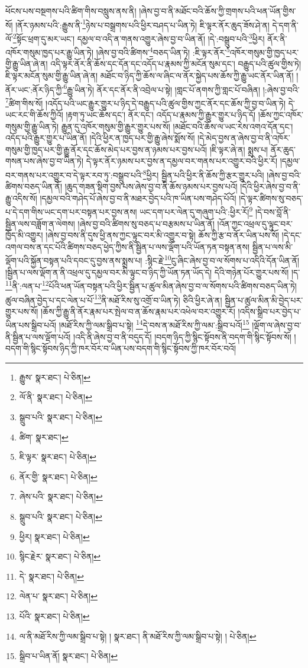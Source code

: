 ཕོངས་པས་བསྔགས་པའི་ཚིག་གིས་བསླུས་ནས་ནི། །ཞེས་བྱ་བ་ནི་མཐོང་བའི་ཆོས་ཀྱི་གྲགས་པའི་ཕན་ཡོན་གྱིས་སོ། །ནོར་ཉམས་པའི་:རྒྱུས་ནི་\footnote{རྒྱུས་  སྣར་ཐང་།  པེ་ཅིན། }ཉེས་པ་བསྒྲགས་པའི་ཕྱིར་བཤད་པ་ཡིན་ཏེ། ཇི་ལྟར་ནོར་ཆུད་ཟོས་ཤེ་ན། དེ་དག་ནི་ལོ་\footnote{ལོ་ནི་  སྣར་ཐང་།  པེ་ཅིན། }སྟོང་ཕྲག་དུ་མར་ཡང་། དམྱལ་བ་འདི་ན་གནས་འགྱུར་ཞེས་བྱ་བ་ཡིན་ནོ། །དེ་:བསྒྲུབ་པའི་\footnote{སྒྲུབ་པའི་  སྣར་ཐང་།  པེ་ཅིན། }ཕྱིར། ནོར་ནི་འཁོར་གསུམ་ཁྱད་པར་རྒྱུ་ཡིན་ཏེ། །ཞེས་བྱ་བའི་ཚིགས་\footnote{ཚིག་  སྣར་ཐང་། }བཅད་ཡིན་ཏེ། :ཇི་ལྟར་ནོར་\footnote{ཇི་ལྟར་  སྣར་ཐང་།  པེ་ཅིན། }འཁོར་གསུམ་གྱི་ཁྱད་པར་གྱི་རྒྱུ་ཡིན་ཞེ་ན། འདི་ལྟར་ནོར་ནི་ཆོས་དང་དོན་དང་འདོད་པ་རྣམས་ཀྱི་མངོན་སུམ་དང་། བརྒྱུད་པའི་ཚུལ་གྱིས་ཏེ། ཇི་ལྟར་མངོན་སུམ་གྱི་རྒྱུ་ཡིན་ཞེ་ན། མཐོང་བ་ཉིད་ཀྱི་ཆོས་ལ་ཞིང་ལ་ནོར་སྐྱེད་པས་ཆོས་ཀྱི་རྒྱུ་ཡང་ནོར་ཡིན་ནོ། །ནོར་ཡང་:ནོར་ཉིད་ཀྱི་\footnote{ནོར་གྱི་  སྣར་ཐང་།  པེ་ཅིན། }རྒྱུ་ཡིན་ཏེ། ནོར་དང་ནོར་ནི་འབྲེལ་པ་སྟེ། །གླང་པོ་ནགས་ཀྱི་གླང་པོ་བཞིན། །:ཞེས་བྱ་བའི་\footnote{ཞེས་པའི་  སྣར་ཐང་།  པེ་ཅིན། }ཚིག་གིས་སོ། །འདོད་པའི་ཡང་རྒྱུར་གྱུར་པ་ཉིད་དེ་བརྒྱུད་པའི་ཚུལ་གྱིས་ཀྱང་ནོར་དང་ཆོས་ཀྱི་བྱ་བ་ཡིན་ཏེ། དེ་ཡང་རང་གི་ཆོས་ཀྱིའོ། །རྟག་ཏུ་ཡང་ཆོས་དང་། ནོར་དང་། འདོད་པ་རྣམས་ཀྱི་རྒྱུར་གྱུར་པ་ཉིད་དོ། །ཆོས་ཀྱང་འཁོར་གསུམ་གྱི་རྒྱུ་ཡིན་ཏེ། རྒྱུན་དུ་འཁོར་གསུམ་གྱི་རྒྱུར་གྱུར་པས་སོ། །མཐོང་བའི་ཆོས་ལ་ཡང་རེས་འགའ་དོན་དང་། འདོད་པའི་རྒྱུར་གྱུར་པ་ཡིན་ནོ། །དེའི་ཕྱིར་ན་ཁྱད་པར་གྱི་རྒྱུ་ཞེས་སྨོས་སོ། །དེ་མེད་བྱས་ན་ཞེས་བྱ་བ་ནི་འཁོར་གསུམ་གྱི་ཁྱད་པར་གྱི་རྒྱུ་ནོར་དང་ཆོས་མེད་པར་བྱས་ན་ཉམས་པར་བྱས་པའོ། །ཇི་ལྟར་ཞེ་ན། སྨྲས་པ། ནོར་ཆུད་གསན་པས་ཞེས་བྱ་བ་ཡིན་ཏེ། དེ་ལྟར་ནོར་ཉམས་པར་བྱས་ན་དམྱལ་བར་གནས་པར་འགྱུར་བའི་ཕྱིར་རོ། །དམྱལ་བར་གནས་པར་འགྱུར་བ་དེ་ལྟར་རབ་ཏུ་:བསྒྲུབ་པའི་\footnote{སྒྲུབ་པའི་  སྣར་ཐང་།  པེ་ཅིན། }ཕྱིར། སྦྱིན་པའི་ཕྱིར་ནི་ཆོས་ཀྱི་རྩར་གྱུར་པའི། །ཞེས་བྱ་བའི་ཚིགས་བཅད་ཡིན་ནོ། །ཆུད་གཟན་སྡིག་བྱས་པས་ཞེས་བྱ་བ་ནི་ཆོས་ཉམས་པར་བྱས་པའོ། །དེའི་ཕྱིར་ཞེས་བྱ་བ་ནི་རྒྱུ་འདིས་སོ། །དམྱལ་བའི་གཤེད་པོ་ཞེས་བྱ་བ་ནི་མཐར་བྱེད་པའི་ཁ་ཡིན་པས་གཤེད་པོའོ། །དེ་ལྟར་ཚིགས་སུ་བཅད་པ་དེ་དག་གིས་ཡང་དག་པར་བསྟན་པར་བྱས་ནས། ཡང་དག་པར་ལེན་དུ་གཞུག་པའི་:ཕྱིར་རོ།\footnote{ཕྱིར།  སྣར་ཐང་།  པེ་ཅིན། } །དེ་བས་བློ་ནི་སྦྱིན་ལས་བཟློག་ན་ལེགས། །ཞེས་བྱ་བའི་ཚིགས་སུ་བཅད་པ་བརྩམས་པ་ཡིན་ནོ། །འོན་ཀྱང་འཕྲལ་དུ་ལྟུང་བར་ཁྱོད་མི་འགྱུར། །ཞེས་བྱ་བས་ནི་དུས་ཕྱི་ནས་ཀྱང་ལྟུང་བར་མི་འགྱུར་བ་སྟེ། ཆོས་ཀྱི་རྩ་བ་ནོར་ཡིན་པས་སོ། །དེ་དང་འགལ་བས་ན་དང་པོའི་ཚིགས་བཅད་ཕྱེད་ཀྱིས་ནི་སྦྱིན་པ་ལས་ལྡོག་པའི་ཡོན་ཏན་བསྟན་ནས། སྦྱིན་པ་ལས་མི་ལྡོག་པའི་སྐྱོན་བསྟན་པའི་དབང་དུ་བྱས་ནས་སྨྲས་པ། :སྙིང་རྗེ་\footnote{སྙིང་རྗེར་  སྣར་ཐང་།  པེ་ཅིན། }ངུ་ཞིང་ཞེས་བྱ་བ་ལ་སོགས་པ་འདིའི་དོན་ཡིན་ནོ། །སྦྱིན་པ་ལས་ལྡོག་ན་ནི་འཕྲལ་དུ་དམྱལ་བར་མི་ལྟུང་བ་ཉིད་ཀྱི་ཡོན་ཏན་ཡོད་དེ། དེའི་གཉེན་པོར་གྱུར་པས་སོ། །ད་\footnote{དེ་  སྣར་ཐང་།  པེ་ཅིན། }ནི་:ལན་པ་\footnote{ལེན་པ་  སྣར་ཐང་།  པེ་ཅིན། }པོའི་ཕན་ཡོན་བསྟན་པའི་ཕྱིར་སྦྱིན་པ་ཚུལ་མིན་ཞེས་བྱ་བ་ལ་སོགས་པའི་ཚིགས་བཅད་ཡིན་ཏེ། ཚུལ་བཞིན་བྱེད་པ་དང་ལེན་པ་པོ་\footnote{པོའི་  སྣར་ཐང་།  པེ་ཅིན། }ནི་མཐོ་རིས་སུ་འགྲོ་བ་ཡིན་ཏེ། ཅིའི་ཕྱིར་ཞེ་ན། སྦྱིན་པ་ཚུལ་མིན་མི་བྱེད་པར་གྱུར་པས་སོ། །ཆོས་ཀྱི་རྒྱུ་ནི་ནོར་རྣམ་པར་སྤེལ་བ་ན་ཆོས་རྣམ་པར་འཕེལ་བར་འགྱུར་རོ། །འདིས་སྒྲིབ་པར་བྱེད་པ་ཡིན་པས་སྒྲིབ་པའོ། །མཐོ་རིས་ཀྱི་ལམ་སྒྲིབ་པ་སྟེ། \footnote{ལ་ནི་མཐོ་རིས་ཀྱི་ལམ་སྒྲིབ་པ་སྟེ། །  སྣར་ཐང་། ནི་མཐོ་རིས་ཀྱི་ལམ་སྒྲིབ་པ་སྟེ། །  པེ་ཅིན། }དེ་བས་ན་མཐོ་རིས་ཀྱི་ལམ་:སྒྲིབ་པའོ།\footnote{སྒྲིབ་པ་ཡིན་ནོ།  སྣར་ཐང་།  པེ་ཅིན། } །ལྡོག་ལ་ཞེས་བྱ་བ་ནི་སྦྱིན་པ་ལས་ལྡོག་པའོ། །འདི་ནི་ཞེས་བྱ་བ་ནི་བདུད་དོ། །བདག་ཉིད་ཀྱི་སྙིང་སྟོབས་ནི་བདག་གི་སྙིང་སྟོབས་སོ། །བདག་གི་སྙིང་སྟོབས་ཉིད་ཀྱི་ཁར་བོར་བ་ཡིན་པས་བདག་གི་སྙིང་སྟོབས་ཀྱི་ཁར་བོར་བའོ། 